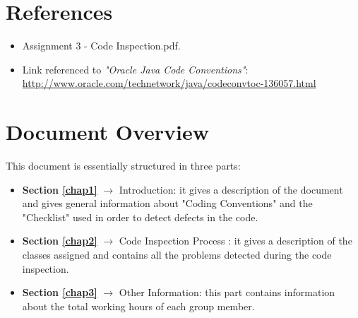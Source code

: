 

\section{References}
\begin{itemize}
	\item Assignment 3 - Code Inspection.pdf.
	\item Link referenced to \textit{"Oracle Java Code Conventions"}:\\
	\href{http://www.oracle.com/technetwork/java/codeconvtoc-136057.html} {http://www.oracle.com/technetwork/java/codeconvtoc-136057.html}
\end{itemize}

\section{Document Overview}
This document is essentially structured in three parts:
\begin{itemize}
	\item \textbf{Section \ref{chap1}} $\rightarrow$ Introduction: it gives a description of the document and gives general information about "Coding Conventions" and the "Checklist" used in order to detect defects in the code.
	\item \textbf{Section \ref{chap2}} $\rightarrow$ Code Inspection Process : it gives a description of the classes assigned and contains all the problems detected during the code inspection.
	\item \textbf{Section \ref{chap3}} $\rightarrow$ Other Information: this part contains information about the total working hours of each group member.
\end{itemize}